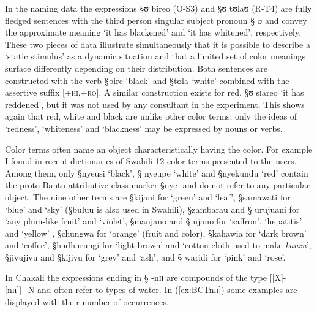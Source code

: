 In the naming data  the expressions {\S ʊ bireo} (O-S3) and {\S ʊ tʊlaʊ} (R-T4)
are fully fledged sentences with the third person singular subject pronoun {\S
ʊ} and convey the approximate meaning `it has blackened' and `it has whitened', 
respectively. These two pieces of data illustrate simultaneously that it is
possible to describe a `static stimulus' as  a dynamic situation  and
that a limited set of color meanings surface differently depending on their
distribution. Both sentences are constructed with the verb  {\S bire} `black'
and  {\S tʊla} `white' combined with the assertive suffix
\textsc{[+hi,+ro]}.
A similar construction exists for red, {\S ʊ sɪareo} `it has reddened', but it
was not used by any consultant in the experiment. This shows again that red,
white and black are unlike other color terms;  only the ideas of `redness',
`whiteness' and `blackness' may be expressed by nouns or verbs.


Color terms often name an object characteristically having the color. For
example I found in  recent dictionaries of Swahili \citep{John91, Kian07} 12
color terms  presented to the users. Among them, only {\S nyeusi} `black', {\S
nyeupe} `white' and {\S nyekundu} `red'  contain the proto-Bantu attributive
class marker {\S nye-} and do not refer to any particular object.  The nine
other terms are {\S kijani} for  `green' and `leaf', {\S samawati} for
`blue' and `sky' ({\S buluu} is also used in Swahili), {\S zambarau} and {\S
urujuani} for `any plum-like fruit' and `violet', {\S manjano} and {\S
njano} for `saffron', `hepatitis' and `yellow' , {\S chungwa} for
`orange' (fruit and color), {\S kahawia} for `dark brown' and
`coffee', {\S hudhurungi} for `light brown' and `cotton cloth used to make
{\it kanzu}', {\S jivujivu} and {\S kijivu} for `grey' and `ash', and  {\S
waridi} for `pink' and `rose'. 



In Chakali  the expressions ending in {\S
-nɪɪ} are compounds of the type [[X]-[nɪɪ]]_{N} and often refer to types
of water. In (\ref{ex:BCTnɪɪ})  some
examples are displayed with their number of occurrences.  





